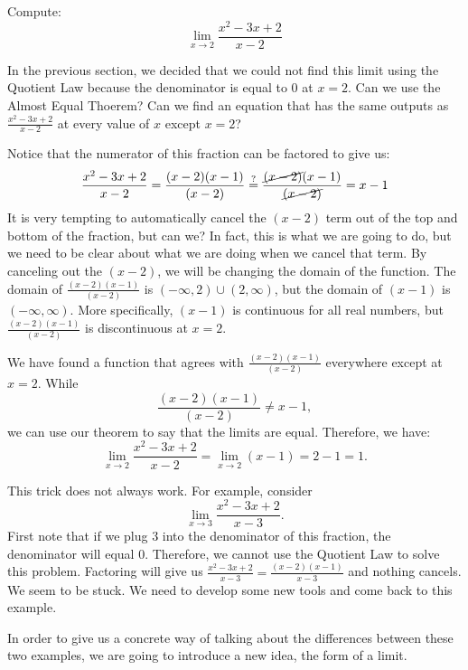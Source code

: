 \documentclass{ximera}
\begin{document}
\begin{example}
  Compute:
  \[
  \lim_{x\to 2}\frac{x^2-3x+2}{x-2}
  \]
  \begin{explanation}
    In the previous section, we decided that we could not find this
    limit using the Quotient Law because the denominator is equal to 0
    at $x=2$.  Can we use the Almost Equal Thoerem? Can we find an
    equation that has the same outputs as $\frac{x^2-3x+2}{x-2}$ at
    every value of $x$ except $x=2$?
    
    Notice that the numerator of this fraction can be factored to give us:
    \[
    \frac{x^2-3x+2}{x-2} =  \frac{(x-2)(x-1)}{(x-2)} \stackrel{?}{=}\frac{\cancel{(x-2)}(x-1)}{\cancel{(x-2)}}=x-1
    \]
    It is very tempting to automatically cancel the $(x-2)$ term out
    of the top and bottom of the fraction, but can we?  In fact, this
    is what we are going to do, but we need to be clear about what we
    are doing when we cancel that term.  By canceling out the $(x-2)$,
    we will be changing the domain of the function.  The domain of
    $\frac{(x-2)(x-1)}{(x-2)}$ is $(-\infty,2)\cup(2,\infty)$, but the
    domain of $(x-1)$ is $(-\infty,\infty)$.  More specifically,
    $(x-1)$ is continuous for all real numbers, but
    $\frac{(x-2)(x-1)}{(x-2)}$ is discontinuous at $x=2$.
 
 
    We have found a function that agrees with
    $\frac{(x-2)(x-1)}{(x-2)}$ everywhere except at $x=2$.  While
    \[
    \frac{(x-2)(x-1)}{(x-2)} \neq x-1,
    \]
    we can use our theorem to say that the limits are equal.
    Therefore, we have:
    \[
    \lim_{x\to 2}\frac{x^2-3x+2}{x-2} = \lim_{x\to 2} (x-1) = 2-1 =1.
    \]
  \end{explanation}
\end{example} 

This trick does not always work.  For example, consider
\[
\lim_{x\to 3}\frac{x^2-3x+2}{x-3}.
\]
First note that if we plug $3$ into the denominator of this fraction,
the denominator will equal $0$.  Therefore, we cannot use the Quotient
Law to solve this problem.  Factoring will give us
$\frac{x^2-3x+2}{x-3}=\frac{(x-2)(x-1)}{x-3}$ and nothing cancels.  We
seem to be stuck.  We need to develop some new tools and come back to
this example.

In order to give us a concrete way of talking about the differences
between these two examples, we are going to introduce a new idea, the
form of a limit.
\end{document}

